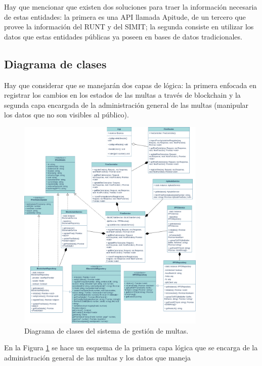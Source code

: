 Hay que mencionar que existen dos soluciones para traer la información necesaria de estas entidades: la primera es una API llamada Apitude, de un tercero que provee la información del RUNT y del SIMIT; la segunda consiste en utilizar los datos que estas entidades públicas ya poseen en bases de datos tradicionales. 
 \subsection{ Diagrama de clases }
Hay que considerar que se manejarán dos capas de lógica: la primera enfocada en registrar los cambios en los estados de las multas a través de blockchain y la segunda capa encargada de la administración general de las multas (manipular los datos que no son visibles al público). 
 \begin{figure}[htbp]
    \centering
    \includegraphics[width=0.8\textwidth]{Images/uml.png}
    \caption{Diagrama de clases del sistema de gestión de multas.}
    \label{fig:diagrama_clases}
\end{figure}
En la Figura \ref{fig:diagrama_clases} se hace un esquema de la primera capa lógica que se encarga de la administración general de las multas y los datos que maneja
